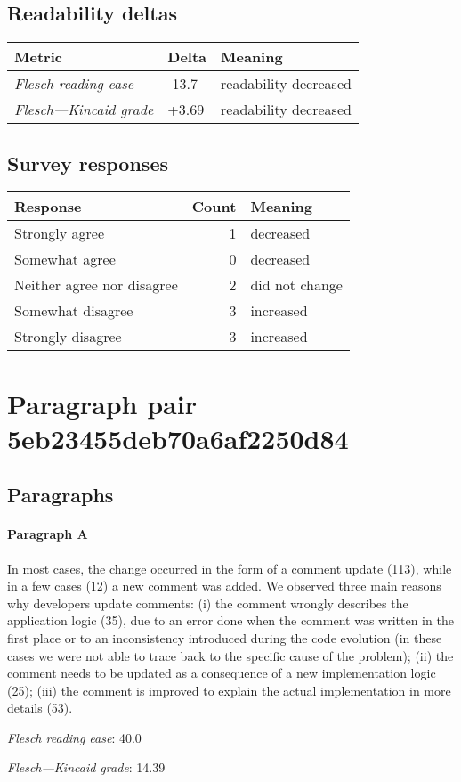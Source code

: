 \subsection{Readability deltas}

\begin{tabular}{lll}
\toprule
               \textbf{Metric} & \textbf{Delta} &       \textbf{Meaning} \\
\midrule
    \emph{Flesch reading ease} &          -13.7 &  readability decreased \\
 \emph{Flesch---Kincaid grade} &          +3.69 &  readability decreased \\
\bottomrule
\end{tabular}

\subsection{Survey responses}
\begin{tabular}{lrl}
\toprule
          \textbf{Response} &  \textbf{Count} & \textbf{Meaning} \\
\midrule
             Strongly agree &               1 &        decreased \\
             Somewhat agree &               0 &        decreased \\
 Neither agree nor disagree &               2 &   did not change \\
          Somewhat disagree &               3 &        increased \\
          Strongly disagree &               3 &        increased \\
\bottomrule
\end{tabular}

\section{Paragraph pair 5eb23455deb70a6af2250d84}
\subsection{Paragraphs}
\paragraph{Paragraph A}
In most cases, the change occurred in the form of a comment update (113), while in a few cases (12) a new comment was added. We observed three main reasons why developers update comments: (i) the comment wrongly describes the application logic (35), due to an error done when the comment was written in the first place or to an inconsistency introduced during the code evolution (in these cases we were not able to trace back to the specific cause of the problem); (ii) the comment needs to be updated as a consequence of a new implementation logic (25); (iii) the comment is improved to explain the actual implementation in more details (53).\par\medskip
\emph{Flesch reading ease}: 40.0\par
\emph{Flesch---Kincaid grade}: 14.39

